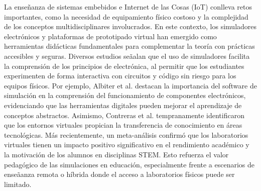 \documentclass{article}
\begin{document}
La ense\~nanza de sistemas embebidos e Internet de las Cosas (IoT) conlleva retos importantes, como la necesidad de equipamiento f\'isico costoso y la complejidad de los conceptos multidisciplinares involucrados. En este contexto, los simuladores electrónicos y plataformas de prototipado virtual han emergido como herramientas did\'acticas fundamentales para complementar la teor\'ia con pr\'acticas accesibles y seguras\cite{Albiter2019, Contreras2010}. Diversos estudios se\~aalan que el uso de simuladores facilita la comprensión de los principios de electrónica, al permitir que los estudiantes experimenten de forma interactiva con circuitos y código sin riesgo para los equipos f\'isicos. Por ejemplo, Albiter et al. \cite{Albiter2019} destacan la importancia del software de simulación en la comprensión del funcionamiento de componentes electrónicos, evidenciando que las herramientas digitales pueden mejorar el aprendizaje de conceptos abstractos. Asimismo, Contreras et al. \cite{Contreras2010} tempranamente identificaron que los entornos virtuales propician la transferencia de conocimiento en \'areas tecnológicas. M\'as recientemente, un meta-an\'alisis confirmó que los laboratorios virtuales tienen un impacto positivo significativo en el rendimiento académico y la motivación de los alumnos en disciplinas STEM\cite{Zaturrahmi2020}. Esto refuerza el valor pedagógico de las simulaciones en educación, especialmente frente a escenarios de ense\~aanza remota o h\'ibrida donde el acceso a laboratorios f\'isicos puede ser limitado.
\\\\
\end{document}
